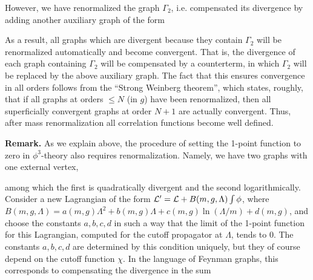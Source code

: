 \documentclass[11pt]{article}
\def\L{\Lambda}
\begin{document}
\begin{center} 

 
\end{center}


However, we have renormalized the graph $\Gamma_2$, i.e. compensated 
its divergence by adding another auxiliary graph of the form

\hfill

\begin{center} 

 
\end{center}

\hfill

As a result, all graphs which are divergent because they contain $\Gamma_2$
will be renormalized automatically and become convergent. That is, the divergence of each graph containing $\Gamma_2$ will  be compensated by
a counterterm, in which $\Gamma_2$ will be replaced by the above auxiliary
graph. The fact that this ensures convergence in all orders follows from
the ``Strong Weinberg theorem'', which states, roughly, that if all graphs 
at orders $\le N$ (in $g$) have been renormalized, then all superficially
convergent graphs at order $N+1$ are actually convergent. 
Thus, after mass renormalization all correlation functions
become well defined. 

{\bf Remark.} As we explain above, the procedure of setting the 1-point 
function to zero in $\phi^3$-theory also requires renormalization. 
Namely, we have two graphs with one external vertex,
\begin{center} 

 
\end{center}

\noindent
among which the first is quadratically divergent and the second 
logarithmically. Consider a new Lagrangian of the form
${\cal L}'={\cal L}+B(m,g,\L)\int \phi$, where $B(m,g,\L)=
a(m,g)\L^2+b(m,g)\L+c(m,g)\ln(\L/m)+d(m,g)$, and choose the constants
$a,b,c,d$ in such a way that the limit of the 1-point function
for this Lagrangian, computed for
the cutoff propagator at $\L$, tends to $0$.
The constants $a,b,c,d$ are determined by this condition uniquely, but 
they of course depend on the cutoff function $\chi$. In the language of 
Feynman graphs, this corresponds to compensating the divergence 
in the sum
\begin{center} 

 
\end{center}
\end{document}
